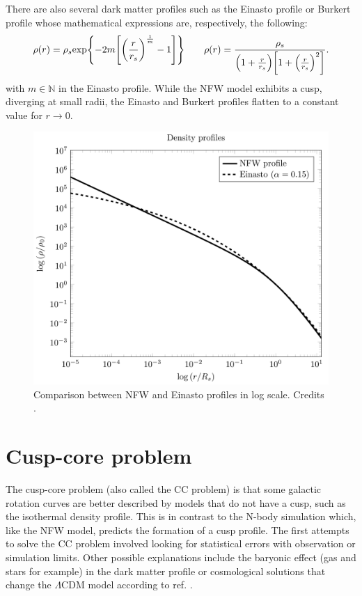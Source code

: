 There are also several dark matter profiles such as the Einasto profile or Burkert profile whose mathematical expressions are, respectively, the following:
\begin{equation}
    \rho(r) = \rho_s \text{exp} \qty{-2m\qty[\qty(\frac{r}{r_s})^{\frac{1}{m}}-1]} \qquad \rho (r) = \frac{\rho_s}{\qty(1+\frac{r}{r_s}) \qty[1 + \qty(\frac{r}{r_s})^2]}.
\end{equation}
with $m \in \mathbb{N}$ in the Einasto profile. While the NFW model exhibits a cusp, diverging at small radii, the Einasto and Burkert profiles flatten to a constant value for $r \rightarrow 0$.
\begin{figure}[h!]
    \centering
    \includegraphics[width=0.4925\linewidth]{Images/Chapter2/Comparison_of_NFW_and_Einasto_profiles.svg.png}
    \caption[Comparison between NFW and Einasto profiles]{Comparison between NFW and Einasto profiles in log scale. Credits \cite{wikiNFWprofile}.}
\label{NFW and Einasto profile}
\end{figure}

\section{Cusp-core problem}
The cusp-core problem (also called the CC problem) is that some galactic rotation curves are better described by models that do not have a cusp, such as the isothermal density profile. This is in contrast to the N-body simulation which, like the NFW model, predicts the formation of a cusp profile.
The first attempts to solve the CC problem involved looking for statistical errors with observation or simulation limits. Other possible explanations include the baryonic effect (gas and stars for example) in the dark matter profile or cosmological solutions that change the $\Lambda$CDM model according to ref. \cite{Cusp-Core-Problem-Del-Popolo}.

